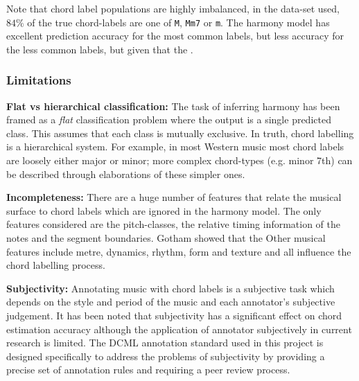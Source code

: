 \documentclass[12pt,a4paper,twoside,openany]{report} \usepackage[pdfborder={0 0 0}]{hyperref}    %
\theoremstyle{definition} \newtheorem{definition}{Definition}[section]
\begin{document}
  Note that chord label populations are highly imbalanced, in the data-set used, $84\%$ of the true chord-labels are one of \texttt{M},
  \texttt{Mm7} or \texttt{m}. The harmony model has excellent prediction accuracy for the most common labels, but
  less accuracy for the less common labels, but given that the . 

  \subsubsection{Limitations}

  \textbf{Flat vs hierarchical classification: } The task of inferring harmony has been framed as a \textit{flat}
  classification problem where the output is a single predicted class. This assumes that each class is mutually
  exclusive. In truth, chord labelling is a hierarchical system. For example, in most Western music most chord labels
  are loosely either major or minor; more complex chord-types (e.g. minor 7th) can be described through elaborations of
  these simpler ones.

  \textbf{Incompleteness: } There are a huge number of features that relate the musical surface to chord labels which are
  ignored in the harmony model. The only features considered are the pitch-classes, the relative timing information of the
  notes and the segment boundaries. Gotham showed that the  Other musical features include metre, dynamics, rhythm, form
  and texture and all influence the chord labelling process. 

  \textbf{Subjectivity: } Annotating music with chord labels is a subjective task which depends on the style
  and period of the music and each annotator's subjective judgement. It has been noted that subjectivity has a significant
  effect on chord estimation accuracy\cite{niUnderstandingEffectsSubjectivity2013} although the application of annotator
  subjectively in current research is limited. The DCML annotation standard used in this project is
  designed specifically to address the problems of subjectivity by providing a precise set of annotation rules and
  requiring a peer review process. 

\end{document}

